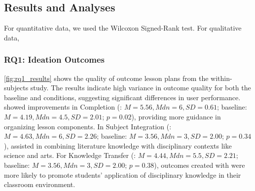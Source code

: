  

\subsection{Results and Analyses}
For quantitative data, we used the Wilcoxon Signed-Rank test.
For qualitative data,



\subsubsection{RQ1: Ideation Outcomes}
\autoref{fig:rq1_results} shows the quality of outcome lesson plans from the within-subjects study.
The results indicate high variance in outcome quality for both the baseline and \name{} conditions, suggesting significant differences in user performance. 
\name{} showed improvements in Completion (\name{}: $M = 5.56, Mdn=6, SD = 0.61$; baseline: $M = 4.19, Mdn=4.5, SD = 2.01$; $p = 0.02$), providing more guidance in organizing lesson components. In Subject Integration (\name{}: $M = 4.63, Mdn=6, SD = 2.26$; baseline: $M = 3.56, Mdn=3, SD = 2.00$; $ p = 0.34$), \name{} assisted in combining literature knowledge with disciplinary contexts like science and arts. For Knowledge Transfer (\name{}: $M = 4.44, Mdn=5.5, SD = 2.21$; baseline: $M = 3.56, Mdn=3, SD = 2.00$; $p = 0.38$), outcomes created with \name{} were more likely to promote students' application of disciplinary knowledge in their classroom environment.

